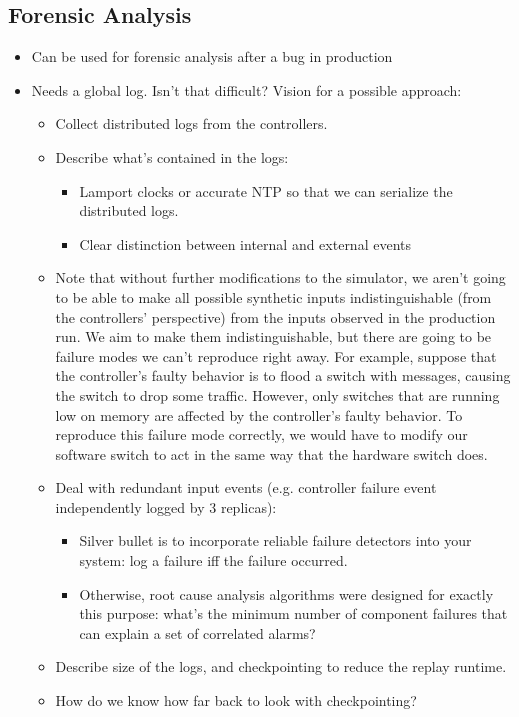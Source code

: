 \subsection{Forensic Analysis}

\begin{itemize}
\item Can be used for forensic analysis after a bug in production
\item Needs a global log. Isn't that difficult? Vision for a possible approach:
\begin{itemize}
\item Collect distributed logs from the controllers.
\item Describe what's contained in the logs:
  \begin{itemize}
   \item Lamport clocks or accurate NTP so that we can serialize the distributed logs.
   \item Clear distinction between internal and external events
  \end{itemize}
\item Note that without further modifications to the simulator, we aren't going to be able to make all possible synthetic inputs indistinguishable (from the controllers' perspective) from the inputs observed in the production run. We aim to make them indistinguishable, but there are going to be failure modes we can't reproduce right away. For example, suppose that the controller's faulty behavior is to flood a switch with messages, causing the switch to drop some traffic. However, only switches that are running low on memory are affected by the controller's faulty behavior. To reproduce this failure mode correctly, we would have to modify our software switch to act in the same way that the hardware switch does.
\item Deal with redundant input events (e.g. controller failure event independently logged by 3 replicas):
  \begin{itemize}
    \item Silver bullet is to incorporate reliable failure detectors into your system: log a failure iff the failure occurred.
    \item Otherwise, root cause analysis algorithms were designed for exactly this purpose: what's the minimum number of component failures that can explain a set of correlated alarms?
  \end{itemize}
\item Describe size of the logs, and checkpointing to reduce the replay runtime.
\item How do we know how far back to look with checkpointing?
\end{itemize}
\end{itemize}

